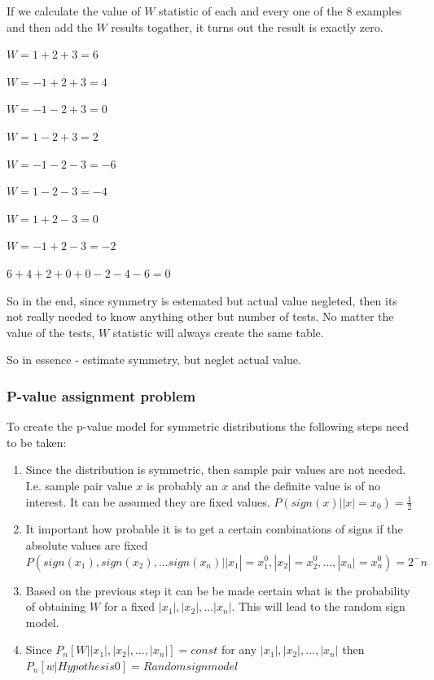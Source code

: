 \documentclass[12pt]{article}
\begin{document}
If we calculate the value of $W$ statistic of each and every one of the 8 examples and then add the $W$ results togather, it turns out the result is exactly zero.

$W = 1 + 2 + 3 = 6$

$W = -1 + 2 + 3 = 4$

$W = -1 - 2 + 3 = 0$

$W = 1 - 2 + 3 = 2$

$W = -1 - 2 - 3 = -6$

$W = 1 - 2 - 3 = -4$

$W = 1 + 2 - 3 = 0$

$W = -1 + 2 - 3 = -2$

$6 + 4 + 2 + 0 + 0 -2 - 4 - 6 = 0$

So in the end, since symmetry is estemated but actual value negleted, then its not really needed to know anything other but number of tests. No matter the value of the tests, $W$ statistic will always create the same table.

So in essence - estimate symmetry, but neglet actual value.

\subsubsection{P-value assignment problem}

To create the p-value model for symmetric distributions the following steps need to be taken:

\begin{enumerate}
\item Since the distribution is symmetric, then sample pair values are not needed. I.e. sample pair value $x$ is probably an $x$ and the definite value is of no interest. It can be assumed they are fixed values.
$P(sign(x) | |x| = x_0) = \frac{1}{2}$

\item It important how probable it is to get a certain combinations of signs if the absolute values are fixed
$P(sign(x_1), sign(x_2), ... sign(x_n) | |x_1| = x_1^0, |x_2| = x_2^0, ..., |x_n| = x_n^0) = 2^-n$

\item Based on the previous step it can be be made certain what is the probability of obtaining $W$ for a fixed $|x_1|, |x_2|, ... |x_n|$. This will lead to the random sign model.

\item Since $P_n[W | |x_1|, |x_2|, ..., |x_n|] = const$ for any $|x_1|, |x_2|, ..., |x_n|$ then $P_n[w | Hypothesis 0] = Random sign model$

\end{enumerate}
\end{document}
